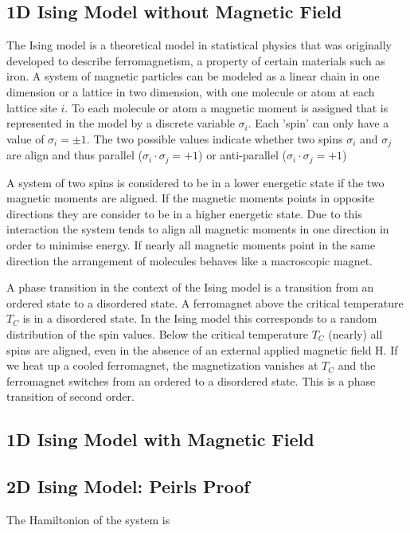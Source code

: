 \documentclass{article}
\theoremstyle{definition}
\begin{document}
\subsection{1D Ising Model without Magnetic Field}
The Ising model is a theoretical model in statistical physics that was originally developed
to describe ferromagnetism, a property of certain materials such as iron. A system of magnetic particles can be modeled as a linear
chain in one dimension or a lattice in two dimension, with one molecule or atom at each
lattice site $i$. To each molecule or atom a magnetic moment is assigned that is represented
in the model by a discrete variable $\sigma_i$. Each 'spin' can only have a value of $\sigma_i = \pm 1$.
The two possible values indicate whether two spins $\sigma_i$ and $\sigma_j$ are align and thus parallel
($\sigma_i \cdot \sigma_j = +1$) or anti-parallel ($\sigma_i \cdot \sigma_j = +1$)

A system of two spins is considered to be in a lower energetic state if the two magnetic
moments are aligned. If the magnetic moments points in opposite directions they are
consider to be in a higher energetic state. Due to this interaction the system tends to
align all magnetic moments in one direction in order to minimise energy. If nearly all
magnetic moments point in the same direction the arrangement of molecules behaves like
a macroscopic magnet.

A phase transition in the context of the Ising model is a transition from an ordered state
to a disordered state. A ferromagnet above the critical temperature $T_C$ is in a disordered
state. In the Ising model this corresponds to a random distribution of the spin values.
Below the critical temperature $T_C$ (nearly) all spins are aligned, even in the absence of an
external applied magnetic field H. If we heat up a cooled ferromagnet, the magnetization
vanishes at $T_C$ and the ferromagnet switches from an ordered to a disordered state. This
is a phase transition of second order.


\subsection{1D Ising Model with Magnetic Field}

\subsection{2D Ising Model: Peirls Proof}
The Hamiltonion of the system is 
\[ \]
\end{document}
